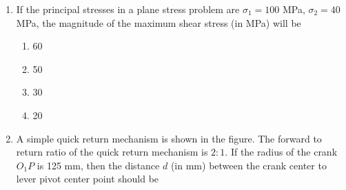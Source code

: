 \documentclass[journal]{IEEEtran}
\begin{document}
\begin{enumerate}
    \begin{center}
    \end{center}

    \begin{multicols}{4}
    \begin{enumerate}
        \item 176.2
        \item 196.0
        \item 481.0
        \item 981.0
    \end{enumerate}
    \end{multicols}

    \item If the principal stresses in a plane stress problem are $\sigma_1 = 100$ MPa,
    $\sigma_2 = 40$ MPa, the magnitude of the maximum shear stress (in MPa) will be
    \begin{multicols}{4}
    \begin{enumerate}
        \item 60
        \item 50
        \item 30
        \item 20
    \end{enumerate}
    \end{multicols}

    \item A simple quick return mechanism is shown in the figure. The forward to return
    ratio of the quick return mechanism is $2:1$. If the radius of the crank $O_1P$ is
    125 mm, then the distance $d$ (in mm) between the crank center to lever pivot center
    point should be

    \begin{center}    
\end{center}
\end{enumerate}
\end{document}
